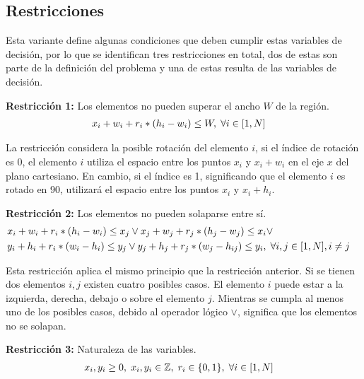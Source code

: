 \documentclass[letter, 10pt]{article}
\begin{document}
\subsection{Restricciones}

Esta variante define algunas condiciones que deben cumplir estas variables de decisi\'on, por lo que se identifican tres restricciones en total, dos de estas son parte de la definici\'on del problema y una de estas resulta de las variables de decisi\'on.

\vspace{0.2cm}
\textbf{Restricci\'on 1:} Los elementos no pueden superar el ancho $W$ de la regi\'on.
\begin{align}
    & x_{i} + w_{i} + r_{i} * (h_{i} - w_{i}) \leq W, \hspace{0.1cm} \forall i \in [1,N] &
\end{align}

La restricci\'on considera la posible rotaci\'on del elemento $i$, si el \'indice de rotaci\'on es 0, el elemento $i$ utiliza el espacio entre los puntos $x_{i}$ y $x_{i} + w_{i}$ en el eje $x$ del plano cartesiano. En cambio, si el \'indice es 1, significando que el elemento $i$ es rotado en 90\textdegree, utilizar\'a el espacio entre los puntos $x_{i}$ y $x_{i} + h_{i}$.

\vspace{0.2cm}
\textbf{Restricci\'on 2:} Los elementos no pueden solaparse entre s\'i.
\begin{align}
    & x_{i} + w_{i} + r_{i} * (h_{i} - w_{i}) \leq x_{j} \vee x_{j} + w_{j} + r_{j} * (h_{j} - w_{j}) \leq x_{i} \vee & \\ \nonumber
    & y_{i} + h_{i} + r_{i} * (w_{i} - h_{i}) \leq y_{j} \vee y_{j} + h_{j} + r_{j} * (w_{j} - h_{ij}) \leq y_{i},\hspace{0.1cm} \forall i,j \in [1,N], i \neq j &
\end{align}

Esta restricci\'on aplica el mismo principio que la restricci\'on anterior. Si se tienen dos elementos $i, j$ existen cuatro posibles casos. El elemento $i$ puede estar a la izquierda, derecha, debajo o sobre el elemento $j$. Mientras se cumpla al menos uno de los posibles casos, debido al operador l\'ogico $\vee$, significa que los elementos no se solapan.

\vspace{0.2cm}
\textbf{Restricci\'on 3:} Naturaleza de las variables.
\begin{align}
    & x_{i}, y_{i} \geq 0, \hspace{0.1cm} x_{i}, y_{i} \in \mathbb{Z}, \hspace{0.1cm} r_{i} \in \{0,1\}, \hspace{0.1cm} \forall i \in [1,N] &
\end{align}
\end{document}
